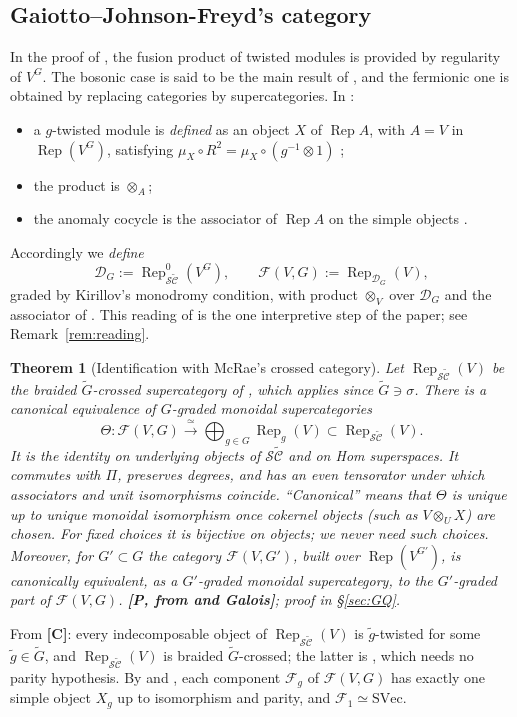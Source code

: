 \documentclass[11pt]{article}
\newtheorem{theorem}{Theorem}[section]
\theoremstyle{definition}
\newcommand{\cD}{\mathcal D}
\newcommand{\cF}{\mathcal F}
\newcommand{\SC}{\mathcal S\widetilde{\mathcal C}}
\newcommand{\Rep}{\operatorname{Rep}}
\newcommand{\tG}{\widetilde G}
\newcommand{\st}[1]{\textbf{[#1]}}
\begin{document}
\subsection{Gaiotto--Johnson-Freyd's category}\label{ssec:GJF}
In the proof of \cite[Thm~4.2]{GJF}, the fusion product of twisted modules is provided by
regularity of $V^G$. The bosonic case is said to be the main result of \cite{Kir02}, and the
fermionic one is obtained by replacing categories by supercategories. In \cite[\S4]{Kir02}:
\begin{itemize}[nosep]
\item a $g$-twisted module is \emph{defined} as an object $X$ of $\Rep A$, with $A=V$ in
$\Rep(V^G)$, satisfying $\mu_X\circ R^2=\mu_X\circ(g^{-1}\otimes1)$ \cite[Def.~4.1]{Kir02};
\item the product is $\otimes_A$;
\item the anomaly cocycle is the associator of $\Rep A$ on the simple objects
\cite[eq.~(5.3)]{Kir02}.
\end{itemize}
Accordingly we \emph{define}
\[
\cD_G:=\Rep^0_{\SC}(V^G),\qquad \cF(V,G):=\Rep_{\cD_G}(V),
\]
graded by Kirillov's monodromy condition, with product $\otimes_V$ over $\cD_G$ and the
associator of \cite[Thm~2.52]{CKM}. This reading of \cite{GJF} is the one interpretive step of
the paper; see Remark~\ref{rem:reading}.

\begin{theorem}[Identification with McRae's crossed category]\label{thm:GQ}
Let $\Rep_{\SC}(V)$ be the braided $\tG$-crossed supercategory of \cite[Thm~4.15]{McR}, which
applies since $\tG\ni\sigma$. There is a canonical equivalence of $G$-graded monoidal
supercategories
\[
\Theta:\cF(V,G)\xrightarrow{\ \simeq\ }\bigoplus_{g\in G}\Rep_g(V)\subset\Rep_{\SC}(V).
\]
It is the identity on underlying objects of $\SC$ and on Hom superspaces. It commutes with $\Pi$,
preserves degrees, and has an even tensorator under which associators and unit isomorphisms
coincide. ``Canonical'' means that $\Theta$ is unique up to unique monoidal isomorphism once
cokernel objects (such as $V\otimes_UX$) are chosen. For fixed choices it is bijective on objects;
we never need such choices.
Moreover, for $G'\subset G$ the category $\cF(V,G')$, built over $\Rep(V^{G'})$, is canonically
equivalent, as a $G'$-graded monoidal supercategory, to the $G'$-graded part of $\cF(V,G)$. \st{P, from \cite{CKM,McR} and Galois}; proof in \S\ref{sec:GQ}.
\end{theorem}

From \cite[Thm~4.15]{McR} \st{C}: every indecomposable object of $\Rep_{\SC}(V)$ is $\tilde
g$-twisted for some $\tilde g\in\tG$, and $\Rep_{\SC}(V)$ is braided $\tG$-crossed; the latter is
\cite[Thm~2.10]{McR}, which needs no parity hypothesis. By \cite[Thm~4.2]{GJF} and
\cite[Thms~4.3, 4.7]{Kir02}, each component $\cF_g$ of $\cF(V,G)$ has exactly one simple object
$X_g$ up to isomorphism and parity, and $\cF_1\simeq\mathrm{SVec}$.
\end{document}
